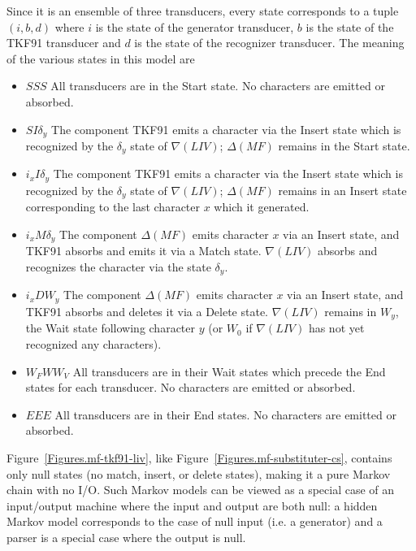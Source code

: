 \documentclass{article}
\newcommand{\figref}[1]{Figure~\ref{Figures.#1}}
\newcommand\generate{\Delta}
\newcommand\recognize{\nabla}
\begin{document}
Since it is an ensemble of three transducers, every state corresponds to a tuple $(i,b,d)$
where
$i$ is the state of the generator transducer,
$b$ is the state of the TKF91 transducer and
$d$ is the state of the recognizer transducer.
The meaning of the various states in this model are
\begin{itemize}
\item $SSS$ All transducers are in the Start state.  No characters are emitted or absorbed. 

\item $SI\delta_y$ The component TKF91 emits a character via the Insert state which is recognized by the $\delta_y$ state of $\recognize(LIV)$; $\generate(MF)$ remains in the Start state. 

\item $i_x I\delta_y$ The component  TKF91 emits a character via the Insert state which is recognized by the $\delta_y$ state of $\recognize(LIV)$; $\generate(MF)$ remains in an Insert state corresponding to the last character $x$ which it generated. 

\item $i_x M\delta_y$ The component  $\generate(MF)$ emits character $x$ via an Insert state, and TKF91 absorbs and emits it via a Match state.  
$\recognize(LIV)$ absorbs and recognizes the character via the state $\delta_y$.  

\item $i_x D W_y$ The component  $\generate(MF)$ emits character $x$ via an Insert state, and TKF91 absorbs and deletes it via a Delete state.  
$\recognize(LIV)$  remains in $W_y$, the Wait  state following character $y$ (or $W_0$ if $\recognize(LIV)$  has not yet recognized any characters). 

\item $W_FWW_V$ All transducers are in their Wait states which precede the End states for each transducer.  No characters are emitted or absorbed. 

\item $EEE$ All transducers are in their End states.  No characters are emitted or absorbed. 
\end{itemize}


\figref{mf-tkf91-liv}, like \figref{mf-substituter-cs}, contains only null states (no match, insert, or delete states), making it a pure Markov chain with no I/O.  
Such Markov models can be viewed as a special case of an input/output machine where the input and output are both null:
a hidden Markov model corresponds to  the case of null input (i.e. a generator)
and a parser is a special case where the output is null.  
\end{document}
